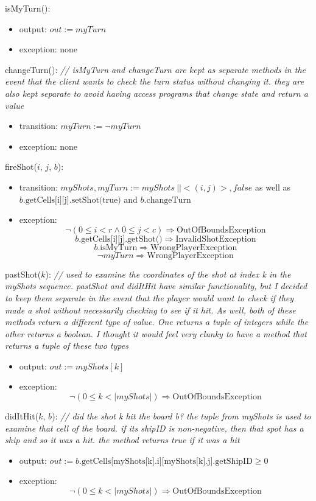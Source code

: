 \documentclass[12pt]{article}
\begin{document}
\noindent isMyTurn():
\begin{itemize}
\item output: $out := myTurn$
\item exception: none
\end{itemize}

\noindent changeTurn(): {\it // isMyTurn and changeTurn are kept as separate methods in the event that the client wants to check the turn status without changing it. they are also kept separate to avoid having access programs that change state and return a value}
\begin{itemize}
\item transition: $myTurn := \neg myTurn$
\item exception: none
\end{itemize}

\noindent fireShot($i$, $j$, $b$):
\begin{itemize}
\item transition: $myShots, myTurn := myShots ~|| <(i, j)>, false $
 \newline as well as 
$b.\mbox{getCells[i][j].setShot(true)}$ and $ b.\mbox{changeTurn}$
\item exception: 
$$ \neg (0 \leq i < r \wedge 0 \leq j < c) \Rightarrow \mbox{OutOfBoundsException} $$
$$ b.\mbox{getCells[i][j].getShot()} \Rightarrow \mbox{InvalidShotException}$$
$$ b.\mbox{isMyTurn} \Rightarrow \mbox{WrongPlayerException} $$
$$ \neg myTurn \Rightarrow \mbox{WrongPlayerException} $$
\end{itemize}

\noindent pastShot($k$): {\it // used to examine the coordinates of the shot at index k in the myShots sequence. pastShot and didItHit have similar functionality, but I decided to keep them separate in the event that the player would want to check if they made a shot without necessarily checking to see if it hit. As well, both of these methods return a different type of value. One returns a tuple of integers while the other returns a boolean. I thought it would feel very clunky to have a method that returns a tuple of these two types }
\begin{itemize}
\item output: $out := myShots[k]$
\item exception: 
$$ \neg (0 \leq k < |myShots|) \Rightarrow \mbox{OutOfBoundsException} $$
\end{itemize}

\noindent didItHit($k$, $b$): {\it // did the shot k hit the board b? the tuple from myShots is used to examine that cell of the board. if its shipID is non-negative, then that spot has a ship and so it was a hit. the method returns true if it was a hit}
\begin{itemize}
\item output: $out := b.\mbox{getCells[myShots[k].i][myShots[k].j].getShipID} \geq 0$
\item exception: 
$$ \neg (0 \leq k < |myShots|) \Rightarrow \mbox{OutOfBoundsException} $$
\end{itemize}
\end{document}
